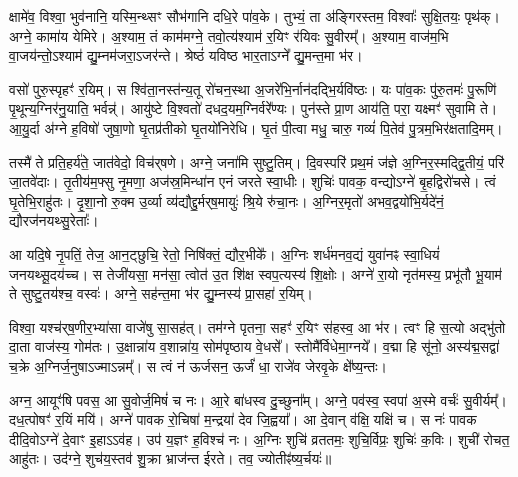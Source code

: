 क्षामे॑व॒ विश्वा॒ भुव॑नानि॒ यस्मि॒न्थ्सꣳ सौभ॑गानि दधि॒रे पा॑व॒के। तुभ्यं॒ ता अ॑ङ्गिरस्तम॒ विश्वाः᳚ सुक्षि॒तयः॒ पृथ॑क्। अग्ने॒ कामा॑य येमिरे। अ॒श्याम॒ तं काम॑मग्ने॒ तवो॒त्य॑श्याम॑ र॒यिꣳ र॑यिवः सु॒वीरम्᳚। अ॒श्याम॒ वाज॑म॒भि वा॒जय॑न्तो॒ऽश्याम॑ द्यु॒म्नम॑जरा॒ऽजर॑न्ते। श्रेष्ठं॑ यविष्ठ भार॒ताऽग्ने᳚ द्यु॒मन्त॒मा भ॑र। 

वसो॑ पुरु॒स्पृहꣳ॑ र॒यिम्। स श्वि॑ता॒नस्त॑न्य॒तू रो॑चन॒स्था अ॒जरे॑भि॒र्नान॑दद्भि॒र्यवि॑ष्ठः। यः पा॑व॒कः पु॑रु॒तमः॑ पु॒रूणि॑ पृ॒थून्य॒ग्निर॑नु॒याति॒ भर्वन्न्॑। आयु॑ष्टे वि॒श्वतो॑ दधद॒यम॒ग्निर्वरे᳚ण्यः। पुन॑स्ते प्रा॒ण आय॑ति॒ परा॒ यक्ष्मꣳ॑ सुवामि ते। आ॒यु॒र्दा अ॑ग्ने ह॒विषो॑ जुषा॒णो घृ॒तप्र॑तीको घृ॒तयो॑निरेधि। घृ॒तं पी॒त्वा मधु॒ चारु॒ गव्यं॑ पि॒तेव॑ पु॒त्रम॒भिर॑क्षतादि॒मम्।

तस्मै॑ ते प्रति॒हर्य॑ते॒ जात॑वेदो॒ विच॑र्‌षणे। अग्ने॒ जना॑मि सुष्टु॒तिम्। दि॒वस्परि॑ प्रथ॒मं ज॑ज्ञे अ॒ग्निर॒स्मद्द्वि॒तीयं॒ परि॑ जा॒तवे॑दाः। तृ॒तीय॑म॒फ्सु नृ॒मणा॒ अज॑स्र॒मिन्धा॑न एनं जरते स्वा॒धीः। शुचिः॑ पावक॒ वन्द्योऽग्ने॑ बृ॒हद्विरो॑चसे। त्वं घृ॒तेभि॒राहु॑तः। दृ॒शा॒नो रु॒क्म उ॒र्व्या व्य॑द्यौद्दु॒र्मर्‌ष॒मायुः॑ श्रि॒ये रु॑चा॒नः। अ॒ग्निर॒मृतो॑ अभव॒द्वयो॑भि॒र्यदे॑नं॒ द्यौरज॑नयथ्सु॒रेताः᳚। 

आ यदि॒षे नृ॒पतिं॒ तेज॒ आन॒ट्छुचि॒ रेतो॒ निषि॑क्तं॒ द्यौर॒भीके᳚।
अ॒ग्निः शर्ध॑मनव॒द्यं युवा॑नꣴ स्वा॒धियं॑ जनयथ्सू॒दय॑च्च। स तेजी॑यसा॒ मन॑सा॒ त्वोत॑ उ॒त शि॑क्ष स्वप॒त्यस्य॑ शि॒क्षोः। अग्ने॑ रा॒यो नृत॑मस्य॒ प्रभू॑तौ भू॒याम॑ ते सुष्टु॒तय॑श्च॒ वस्वः॑। अग्ने॒ सह॑न्त॒मा भ॑र द्यु॒म्नस्य॑ प्रा॒सहा॑ र॒यिम्।

विश्वा॒ यश्च॑र्‌ष॒णीर॒भ्या॑सा वाजे॑षु सा॒सह॑त्। 
तम॑ग्ने पृतना॒ सहꣳ॑ र॒यिꣳ स॑हस्व॒ आ भ॑र। त्वꣳ हि स॒त्यो अद्भु॑तो दा॒ता वाज॑स्य॒ गोम॑तः। उ॒क्षान्ना॑य व॒शान्ना॑य॒ सोम॑पृष्ठाय वे॒धसे᳚। स्तोमै᳚र्विधेमा॒ग्नये᳚। व॒द्मा हि सू॑नो॒ अस्य॑द्म॒सद्वा॑ च॒क्रे अ॒ग्निर्ज॒नुषाऽज्माऽन्नम्᳚। स त्वं न॑ ऊर्जसन॒ ऊर्जं॑ धा॒ राजे॑व जेरवृ॒के क्षे᳚ष्य॒न्तः।

अग्न॒ आयूꣳ॑षि पवस॒ आ सु॒वोर्ज॒मिषं॑ च नः। आ॒रे बा॑धस्व दु॒च्छुना᳚म्। अग्ने॒ पव॑स्व॒ स्वपा॑ अ॒स्मे वर्चः॑ सु॒वीर्यम्᳚। दध॒त्पोषꣳ॑ र॒यिं मयि॑।
अग्ने॑ पावक रो॒चिषा॑ म॒न्द्रया॑ देव जि॒ह्वया᳚। आ दे॒वान् व॑क्षि॒ यक्षि॑ च। स नः॑ पावक दीदि॒वोऽग्ने॑ दे॒वाꣳ इ॒हाऽऽव॑ह। उप॑ य॒ज्ञꣳ ह॒विश्च॑ नः। अ॒ग्निः शुचि॑ व्रततमः॒ शुचि॒र्विप्रः॒ शुचिः॑ क॒विः। शुची॑ रोचत॒ आहु॑तः। उद॑ग्ने॒ शुच॑य॒स्तव॑ शु॒क्रा भ्राज॑न्त ईरते। तव॒ ज्योतीꣴ॑ष्य॒र्चयः॑॥

